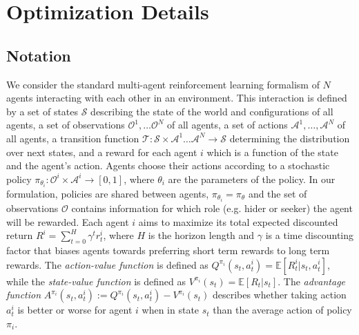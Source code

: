 \section{Optimization Details}
\label{appendix:optimization_hps}

\subsection{Notation}
We consider the standard multi-agent reinforcement learning formalism of $N$ agents interacting with each other in an environment. This interaction is defined by a set of states $\mathcal{S}$ describing the state of the world and configurations of all agents, a set of observations $\mathcal{O}^1, \ldots \mathcal{O}^N$ of all agents, a set of actions $\mathcal{A}^1, \ldots, \mathcal{A}^N$ of all agents, a transition function $\mathcal{T}: \mathcal{S} \times \mathcal{A}^1 \ldots \mathcal{A}^N \rightarrow \mathcal{S}$ determining the distribution over next states, and a reward for each agent $i$ which is a function of the state and the agent's action.
Agents choose their actions according to a stochastic policy $\pi_{\theta_i}: \mathcal{O}^i \times \mathcal{A}^i \rightarrow [0, 1]$, where $\theta_i$ are the parameters of the policy. %
In our formulation, policies are shared between agents, $\pi_{\theta_i} = \pi_{\theta}$ and the set of observations $\mathcal{O}$ contains information for which role (e.g. hider or seeker) the agent will be rewarded. Each agent $i$ aims to maximize its total expected discounted return $R^i = \sum_{t=0}^H \gamma^t r_t^i$, where $H$ is the horizon length and $\gamma$ is a time discounting factor that biases agents towards preferring short term rewards to long term rewards. The \textit{action-value function} is defined as $Q^{\pi_i}(s_t,a_t^i) = \mathbb{E}[R^i_t|s_t,a_t^i]$, while the \textit{state-value function} is defined as $V^{\pi_i}(s_t) = \mathbb{E}[R_t|s_t]$. The \textit{advantage function} $A^{\pi_i}(s_t,a_t^i) := Q^{\pi_i}(s_t,a_t^i) - V^{\pi_i}(s_t)$ describes whether taking action $a_t^i$ is better or worse for agent $i$ when in state $s_t$ than the average action of policy $\pi_i$.

